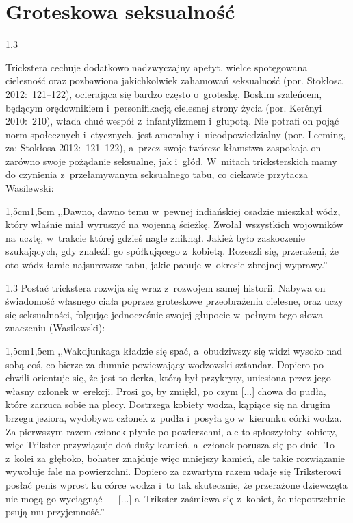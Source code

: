 \documentclass[11pt,a4paper,twoside]{report}
\begin{document}
\section{Groteskowa seksualność}
\begin{spacing}{1.3}

Trickstera cechuje dodatkowo nadzwyczajny apetyt, wielce spotęgowana cielesność oraz pozbawiona jakichkolwiek zahamowań seksualność (por. Stokłosa 2012:~121--122), ocierająca się bardzo często o~groteskę. Boskim szaleńcem, będącym orędownikiem i~personifikacją cielesnej strony życia (por. Kerényi 2010:~210), włada chuć wespół z~infantylizmem i~głupotą. Nie potrafi on pojąć norm społecznych i~etycznych, jest amoralny i~nieodpowiedzialny (por. Leeming, za: Stokłosa 2012:~121--122), a~przez swoje twórcze kłamstwa zaspokaja on zarówno swoje pożądanie seksualne, jak i~głód. W~mitach tricksterskich mamy do czynienia z~przełamywanym seksualnego tabu, co ciekawie przytacza Wasilewski:
\end{spacing}
\begin{adjustwidth}{1,5cm}{1,5cm}
\small{
,,Dawno, dawno temu w~pewnej indiańskiej osadzie mieszkał wódz, który właśnie miał wyruszyć na wojenną ścieżkę. Zwołał wszystkich wojowników na ucztę, w~trakcie której gdzieś nagle zniknął. Jakież było zaskoczenie szukających, gdy znaleźli go spółkującego z~kobietą. Rozeszli się, przerażeni, że oto wódz łamie najsurowsze tabu, jakie panuje w~okresie zbrojnej wyprawy.''\\
}
\end{adjustwidth}

\begin{spacing}{1.3}
Postać trickstera rozwija się wraz z~rozwojem samej historii. Nabywa on świadomość własnego ciała poprzez groteskowe przeobrażenia cielesne, oraz uczy się seksualności, folgując jednocześnie swojej głupocie w~pełnym tego słowa znaczeniu (Wasilewski):
\end{spacing}

\begin{adjustwidth}{1,5cm}{1,5cm}
\small{
,,Wakdjunkaga kładzie się spać, a~obudziwszy się widzi wysoko nad sobą coś, co bierze za dumnie powiewający wodzowski sztandar. Dopiero po chwili orientuje się, że jest to derka, którą był przykryty, uniesiona przez jego własny członek w~erekcji. Prosi go, by zmiękł, po czym [...] chowa do pudła, które zarzuca sobie na plecy. Dostrzega kobiety wodza, kąpiące się na drugim brzegu jeziora, wydobywa członek z~pudła i~posyła go w~kierunku córki wodza. Za pierwszym razem członek płynie po powierzchni, ale to spłoszyłoby kobiety, więc Trikster przywiązuje doń duży kamień, a~członek porusza się po dnie. To z~kolei za głęboko, bohater znajduje więc mniejszy kamień, ale takie rozwiązanie wywołuje fale na powierzchni. Dopiero za czwartym razem udaje się Triksterowi posłać penis wprost ku córce wodza i~to tak skutecznie, że przerażone dziewczęta nie mogą go wyciągnąć --- [...] a~Trikster zaśmiewa się z~kobiet, że niepotrzebnie psują mu przyjemność.''\\
}
\end{adjustwidth}
\end{document}
